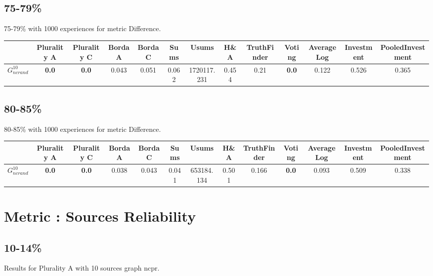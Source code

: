 \documentclass{article}
\newcommand{\graph}[2]{$G_{#1}^{#2}$}
\begin{document}
\subsection{75-79\%}

75-79\% with 1000 experiences for metric Difference.

\noindent\begin{tabular}{|l|c|c|c|c|c|c|c|c|c|c|c|c|}
\hline
& Plurality A& Plurality C& Borda A& Borda C& Sums& Usums& H\&A& TruthFinder& Voting& AverageLog& Investment& PooledInvestment\\
\hline
\graph{ncrand}{10} &\textbf{0.0}&\textbf{0.0}&0.043&0.051&0.062&1720117.231&0.454&0.21&\textbf{0.0}&0.122&0.526&0.365\\
\hline
\end{tabular}
\newpage

\subsection{80-85\%}

80-85\% with 1000 experiences for metric Difference.

\noindent\begin{tabular}{|l|c|c|c|c|c|c|c|c|c|c|c|c|}
\hline
& Plurality A& Plurality C& Borda A& Borda C& Sums& Usums& H\&A& TruthFinder& Voting& AverageLog& Investment& PooledInvestment\\
\hline
\graph{ncrand}{10} &\textbf{0.0}&\textbf{0.0}&0.038&0.043&0.041&653184.134&0.501&0.166&\textbf{0.0}&0.093&0.509&0.338\\
\hline
\end{tabular}
\newpage
\newpage
\section{Metric : Sources Reliability}

\newpage
\newpage

\subsection{10-14\%}

\noindent Results for Plurality A with 10 sources graph ncpr.
\end{document}
